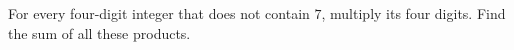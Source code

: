For every four-digit integer that does not contain $7$, multiply its four digits. Find the sum of all these products.
